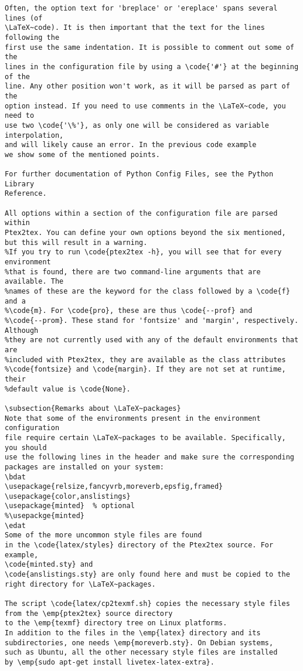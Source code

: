 \documentclass[a4paper,11pt]{article}
\begin{document}
{\begin{Verbatim}
Often, the option text for 'breplace' or 'ereplace' spans several lines (of
\LaTeX~code). It is then important that the text for the lines following the
first use the same indentation. It is possible to comment out some of the
lines in the configuration file by using a \code{'#'} at the beginning of the
line. Any other position won't work, as it will be parsed as part of the
option instead. If you need to use comments in the \LaTeX~code, you need to
use two \code{'\%'}, as only one will be considered as variable interpolation,
and will likely cause an error. In the previous code example
we show some of the mentioned points.

For further documentation of Python Config Files, see the Python Library
Reference.

All options within a section of the configuration file are parsed within
Ptex2tex. You can define your own options beyond the six mentioned,
but this will result in a warning.
%If you try to run \code{ptex2tex -h}, you will see that for every environment
%that is found, there are two command-line arguments that are available. The
%names of these are the keyword for the class followed by a \code{f} and a
%\code{m}. For \code{pro}, these are thus \code{--prof} and
%\code{--prom}. These stand for 'fontsize' and 'margin', respectively. Although
%they are not currently used with any of the default environments that are
%included with Ptex2tex, they are available as the class attributes
%\code{fontsize} and \code{margin}. If they are not set at runtime, their
%default value is \code{None}.

\subsection{Remarks about \LaTeX~packages}
Note that some of the environments present in the environment configuration
file require certain \LaTeX~packages to be available. Specifically, you should
use the following lines in the header and make sure the corresponding
packages are installed on your system:
\bdat
\usepackage{relsize,fancyvrb,moreverb,epsfig,framed}
\usepackage{color,anslistings}
\usepackage{minted}  % optional
%\usepackge{minted}
\edat
Some of the more uncommon style files are found
in the \code{latex/styles} directory of the Ptex2tex source. For example,
\code{minted.sty} and
\code{anslistings.sty} are only found here and must be copied to the
right directory for \LaTeX~packages.

The script \code{latex/cp2texmf.sh} copies the necessary style files
from the \emp{ptex2tex} source directory
to the \emp{texmf} directory tree on Linux platforms.
In addition to the files in the \emp{latex} directory and its
subdirectories, one needs \emp{moreverb.sty}. On Debian systems,
such as Ubuntu, all the other necessary style files are installed
by \emp{sudo apt-get install livetex-latex-extra}.


\end{Verbatim}}
\end{document}
